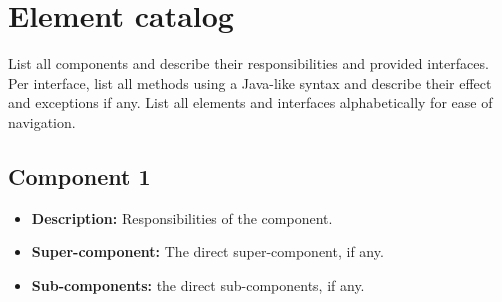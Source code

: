 \section{Element catalog}\label{app:catalog}
List all components and describe their responsibilities and provided
interfaces.
Per interface, list all methods using a Java-like syntax and describe their
effect and exceptions if any.
List all elements and interfaces alphabetically for ease of navigation.

\subsection{Component 1}
\begin{itemize}
    \item \textbf{Description:} Responsibilities of the component.
    \item \textbf{Super-component:} The direct super-component, if any.
    \item \textbf{Sub-components:} the direct sub-components, if any.
\end{itemize}

